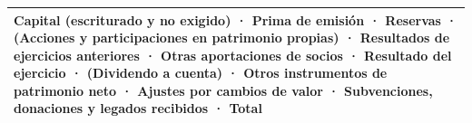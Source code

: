 \documentclass[11pt]{article}
\begin{document}
\begin{table}[H]
\begin{tabular}{>{\raggedright\arraybackslash}m{13.6cm}}
\midrule
Capital (escriturado y no exigido) · Prima de emisión · Reservas · (Acciones y participaciones en patrimonio propias) · Resultados de ejercicios anteriores · Otras aportaciones de socios · Resultado del ejercicio · (Dividendo a cuenta) · Otros instrumentos de patrimonio neto · Ajustes por cambios de valor · Subvenciones, donaciones y legados recibidos · \textbf{Total} \\
\bottomrule
\end{tabular}
\end{table}
\end{document}
